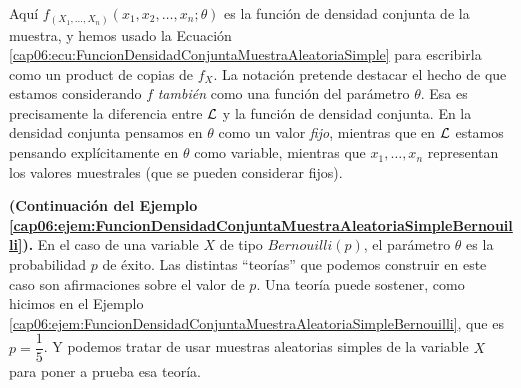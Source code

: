 Aquí $f_{(X_1,\ldots,X_n)}(x_1,x_2,\ldots,x_n;\theta)$ es la función de densidad conjunta de la muestra, y hemos usado la Ecuación \ref{cap06:ecu:FuncionDensidadConjuntaMuestraAleatoriaSimple} para escribirla como un product de copias de $f_X$. La notación pretende destacar el hecho de que estamos considerando $f$ {\em también} como una función del parámetro $\theta$. Esa es precisamente la diferencia entre $\cal L$ y la función de densidad conjunta. En la densidad conjunta pensamos en $\theta$ como un valor {\em fijo}, mientras que en $\cal L$ estamos pensando explícitamente en $\theta$ como variable, mientras que  $x_1,\ldots,x_n$ representan los valores muestrales (que se pueden considerar fijos).

\begin{ejemplo}{\bf (Continuación del Ejemplo \ref{cap06:ejem:FuncionDensidadConjuntaMuestraAleatoriaSimpleBernouilli}).}
\label{cap06:ejem:FuncionDensidadConjuntaMuestraAleatoriaSimpleBernouilli-2}
En el caso de una variable $X$ de tipo $Bernouilli(p)$, el parámetro $\theta$ es la probabilidad $p$ de éxito. Las distintas ``teorías'' que podemos construir en este caso son afirmaciones sobre el  valor de $p$. Una teoría puede sostener, como hicimos en el Ejemplo \ref{cap06:ejem:FuncionDensidadConjuntaMuestraAleatoriaSimpleBernouilli}, que es $p=\dfrac{1}{5}$. Y podemos tratar de usar muestras aleatorias simples de la variable $X$ para poner a prueba esa teoría.


\end{ejemplo}
